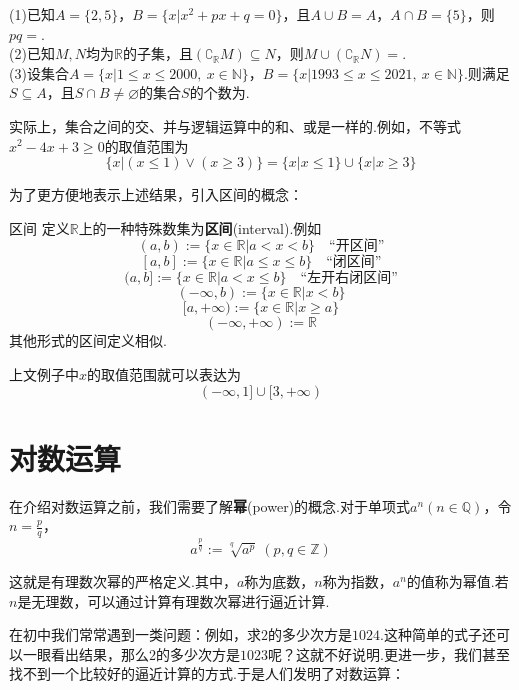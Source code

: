 \documentclass[lang=cn, zihao=4.5]{elegantbook}
\newcommand{\R}{\mathbb{R}}
\newcommand{\tk}{\uline{\hspace{4em}}}
\begin{document}
\begin{example}
	(1)已知$A=\{ 2,5 \}$，$B = \{ x|x^2+px+q=0 \}$，且$A \cup B = A$，$A \cap B = \{ 5 \}$，则$pq=$\tk . \\
	(2)已知$M,N$均为$\mathbb{R}$的子集，且$(\complement _{\mathbb{R}} M) \subseteq N$，则$M \cup (\complement _{\mathbb{R}} N)=$\tk . \\
	(3)设集合$A = \{ x|1 \leq x \leq 2000,~x \in \mathbb{N} \}$，$B = \{ x|1993 \leq x \leq 2021,~x \in \mathbb{N} \}$.则满足$S \subseteq A$，且$S \cap B \neq \varnothing$的集合$S$的个数为\tk .
\end{example}
\begin{solution}
\end{solution}

实际上，集合之间的交、并与逻辑运算中的和、或是一样的.例如，不等式$x^2-4x+3 \geq 0$的取值范围为$$\{ x|(x \leq 1) \vee (x \geq 3) \} = \{ x|x \leq 1 \} \cup \{ x|x \geq 3 \}$$

为了更方便地表示上述结果，引入区间的概念：

\begin{definition}{区间}
	定义$\R$上的一种特殊数集为\textbf{区间}(interval).例如 \\
	$$(a,b):=\{ x \in \R | a<x<b \} \quad \textit{“开区间”}$$
	$$[a,b]:=\{ x \in \R | a \leq x \leq b \} \quad \textit{“闭区间”}$$
	$$(a,b]:=\{ x \in \R | a<x \leq b \} \quad \textit{“左开右闭区间”}$$
	$$(-\infty,b):=\{ x \in \R | x<b \}$$
	$$[a,+\infty):=\{ x \in \R | x \geq a \}$$
	$$(-\infty ,+\infty):= \R $$
	其他形式的区间定义相似.
\end{definition}

上文例子中$x$的取值范围就可以表达为$$(-\infty ,1] \cup [3,+\infty )$$


\chapter{对数运算}

在介绍对数运算之前，我们需要了解\textbf{幂}(power)的概念.对于单项式$a^n(n \in \mathbb{Q})$，令$n=\frac{p}{q}$，
$$a^{\frac{p}{q}}:=\sqrt[q]{a^p} \ (p,q \in \mathbb{Z})$$

这就是有理数次幂的严格定义.其中，$a$称为底数，$n$称为指数，$a^n$的值称为幂值.若$n$是无理数，可以通过计算有理数次幂进行逼近计算.

在初中我们常常遇到一类问题：例如，求$2$的多少次方是$1024$.这种简单的式子还可以一眼看出结果，那么$2$的多少次方是$1023$呢？这就不好说明.更进一步，我们甚至找不到一个比较好的逼近计算的方式.于是人们发明了对数运算：
\end{document}
